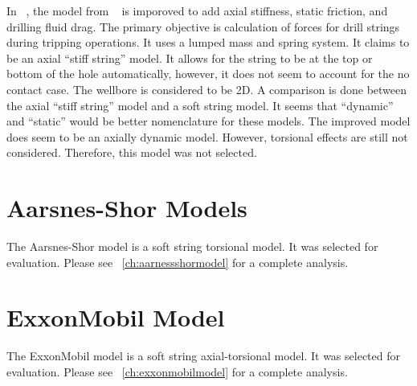 In ~\cite{ref:zamanipour2018a}, the model from  ~\cite{ref:miska2015a} is imporoved to add axial stiffness, static friction, and drilling fluid drag.  The primary objective is calculation of forces for drill strings during tripping operations.  It uses a lumped mass and spring system.  It claims to be an axial ``stiff string'' model.  It allows for the string to be at the top or bottom of the hole automatically, however, it does not seem to account for the no contact case.  The wellbore is considered to be 2D.  A comparison is done between the axial ``stiff string'' model and a soft string model.  It seems that ``dynamic'' and ``static'' would be better nomenclature for these models.  The improved model does seem to be an axially dynamic model.  However, torsional effects are still not considered.  Therefore, this model was not selected.



\section{Aarsnes-Shor Models}
The Aarsnes-Shor model is a soft string torsional model.  It was selected for evaluation.  Please see \chaptername~\ref{ch:aarnessshormodel} for a complete analysis.

\section{ExxonMobil Model}
The ExxonMobil model is a soft string axial-torsional model.  It was selected for evaluation.  Please see \chaptername~\ref{ch:exxonmobilmodel} for a complete analysis. 